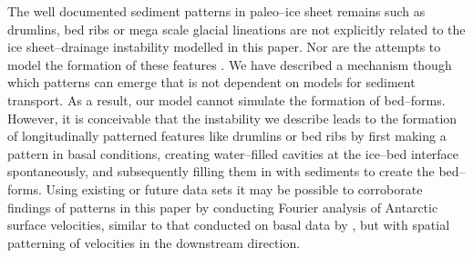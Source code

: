 \documentclass[journal abbreviation, manuscript]{copernicus}
\begin{document}

The well documented sediment patterns in paleo--ice sheet remains \citep[e.g.][]{kinahan1872general, hattestrand1997ribbed} such as drumlins, bed ribs or mega scale glacial lineations are not explicitly related to the ice sheet--drainage instability modelled in this paper. Nor are the attempts to model the formation of these features \citep[e.g.][]{hindmarsh1998stability,hindmarsh1998ice, fowler2000instability, schoof2007pressure, dunlop2008bed,fowler2014instability}. We have described a mechanism though which patterns can emerge that is not dependent on models for sediment transport.  As a result, our model cannot simulate the formation of bed--forms. However, it is conceivable that the instability we describe leads to the formation of longitudinally patterned features like drumlins or bed ribs by first making a pattern in basal conditions, creating water--filled cavities at the ice--bed interface spontaneously, and subsequently filling them in with sediments to create the bed--forms.
Using existing or future data sets \citep[e.g.][]{mouginot2017comprehensive} it may be possible to corroborate findings of patterns in this paper by conducting Fourier analysis of Antarctic surface velocities, similar to that conducted on basal data by \cite{spagnolo2017periodic}, but with spatial patterning of velocities in the downstream direction.

\conclusions  %
\end{document}
